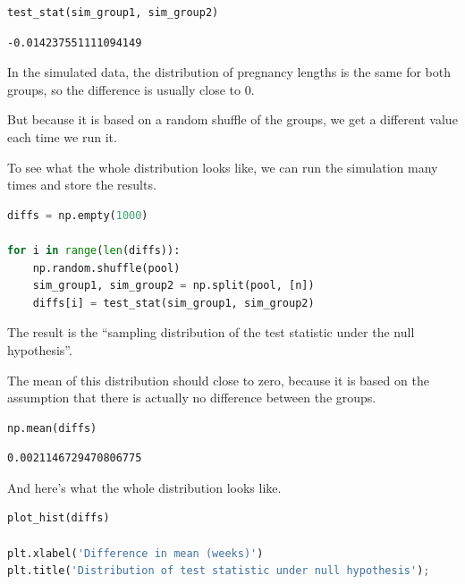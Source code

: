 \begin{lstlisting}[language=Python]
test_stat(sim_group1, sim_group2)
\end{lstlisting}

\begin{lstlisting}[]
-0.014237551111094149
\end{lstlisting}

In the simulated data, the distribution of pregnancy lengths is the same
for both groups, so the difference is usually close to 0.

But because it is based on a random shuffle of the groups, we get a
different value each time we run it.

To see what the whole distribution looks like, we can run the simulation
many times and store the results.

\begin{lstlisting}[language=Python]
diffs = np.empty(1000)

for i in range(len(diffs)):
    np.random.shuffle(pool)
    sim_group1, sim_group2 = np.split(pool, [n])
    diffs[i] = test_stat(sim_group1, sim_group2)
\end{lstlisting}

The result is the ``sampling distribution of the test statistic under
the null hypothesis''.

The mean of this distribution should close to zero, because it is based
on the assumption that there is actually no difference between the
groups.

\begin{lstlisting}[language=Python]
np.mean(diffs)
\end{lstlisting}

\begin{lstlisting}[]
0.0021146729470806775
\end{lstlisting}

And here's what the whole distribution looks like.

\begin{lstlisting}[language=Python]
plot_hist(diffs)

plt.xlabel('Difference in mean (weeks)')
plt.title('Distribution of test statistic under null hypothesis');
\end{lstlisting}


